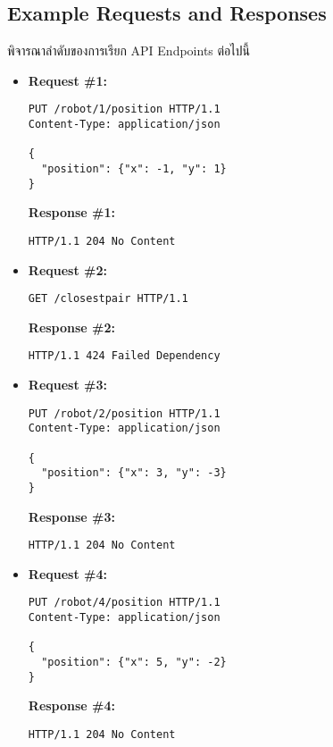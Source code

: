 \subsection{Example Requests and Responses}

\noindent
พิจารณาลำดับของการเรียก API Endpoints ต่อไปนี้

\begin{itemize}
\item  %
\textbf{Request \#1:}
\begin{lstlisting}[xleftmargin=1pc,numbers=none]
PUT /robot/1/position HTTP/1.1
Content-Type: application/json

{
  "position": {"x": -1, "y": 1}
}
\end{lstlisting}
\textbf{Response \#1:}
\begin{lstlisting}[xleftmargin=1pc,numbers=none]
HTTP/1.1 204 No Content
\end{lstlisting}

\item  %
\textbf{Request \#2:}
\begin{lstlisting}[xleftmargin=1pc,numbers=none]
GET /closestpair HTTP/1.1
\end{lstlisting}
\newpage
\textbf{Response \#2:}
\begin{lstlisting}[xleftmargin=1pc,numbers=none]
HTTP/1.1 424 Failed Dependency
\end{lstlisting}

\item  %
\textbf{Request \#3:}
\begin{lstlisting}[xleftmargin=1pc,numbers=none]
PUT /robot/2/position HTTP/1.1
Content-Type: application/json

{
  "position": {"x": 3, "y": -3}
}
\end{lstlisting}
\textbf{Response \#3:}
\begin{lstlisting}[xleftmargin=1pc,numbers=none]
HTTP/1.1 204 No Content
\end{lstlisting}

\item  %
\textbf{Request \#4:}
\begin{lstlisting}[xleftmargin=1pc,numbers=none]
PUT /robot/4/position HTTP/1.1
Content-Type: application/json

{
  "position": {"x": 5, "y": -2}
}
\end{lstlisting}
\textbf{Response \#4:}
\begin{lstlisting}[xleftmargin=1pc,numbers=none]
HTTP/1.1 204 No Content
\end{lstlisting}


\end{itemize}
